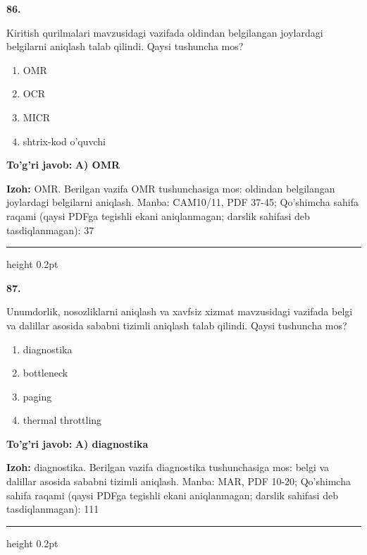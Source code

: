 \documentclass[10pt,a4paper]{article}
\begin{document}
{\bfseries\sffamily\color{ink} 86.}
\par
Kiritish qurilmalari mavzusidagi vazifada oldindan belgilangan joylardagi belgilarni aniqlash talab qilindi. Qaysi tushuncha mos?
\begin{enumerate}[label=\Alph*),leftmargin=9mm]
\item OMR
\item OCR
\item MICR
\item shtrix-kod o'quvchi
\end{enumerate}
\begin{tcolorbox}[enhanced,breakable,colback=teal!4,colframe=teal!60!black,boxrule=0.45pt,arc=1.2mm,left=2.7mm,right=2.7mm,top=1.8mm,bottom=1.8mm,before skip=2mm,after skip=2mm]
{\bfseries\sffamily\color{teal}To'g'ri javob:} \textbf{A) OMR}
\par\smallskip
{\bfseries Izoh:} OMR. Berilgan vazifa OMR tushunchasiga mos: oldindan belgilangan joylardagi belgilarni aniqlash. Manba: CAM10/11, PDF 37-45; Qo'shimcha sahifa raqami (qaysi PDFga tegishli ekani aniqlanmagan; darslik sahifasi deb tasdiqlanmagan): 37
\end{tcolorbox}
\vspace{2mm}\hrule height 0.2pt\vspace{3mm}

{\bfseries\sffamily\color{ink} 87.}
\par
Unumdorlik, nosozliklarni aniqlash va xavfsiz xizmat mavzusidagi vazifada belgi va dalillar asosida sababni tizimli aniqlash talab qilindi. Qaysi tushuncha mos?
\begin{enumerate}[label=\Alph*),leftmargin=9mm]
\item diagnostika
\item bottleneck
\item paging
\item thermal throttling
\end{enumerate}
\begin{tcolorbox}[enhanced,breakable,colback=teal!4,colframe=teal!60!black,boxrule=0.45pt,arc=1.2mm,left=2.7mm,right=2.7mm,top=1.8mm,bottom=1.8mm,before skip=2mm,after skip=2mm]
{\bfseries\sffamily\color{teal}To'g'ri javob:} \textbf{A) diagnostika}
\par\smallskip
{\bfseries Izoh:} diagnostika. Berilgan vazifa diagnostika tushunchasiga mos: belgi va dalillar asosida sababni tizimli aniqlash. Manba: MAR, PDF 10-20; Qo'shimcha sahifa raqami (qaysi PDFga tegishli ekani aniqlanmagan; darslik sahifasi deb tasdiqlanmagan): 111
\end{tcolorbox}
\vspace{2mm}\hrule height 0.2pt\vspace{3mm}
\end{document}
